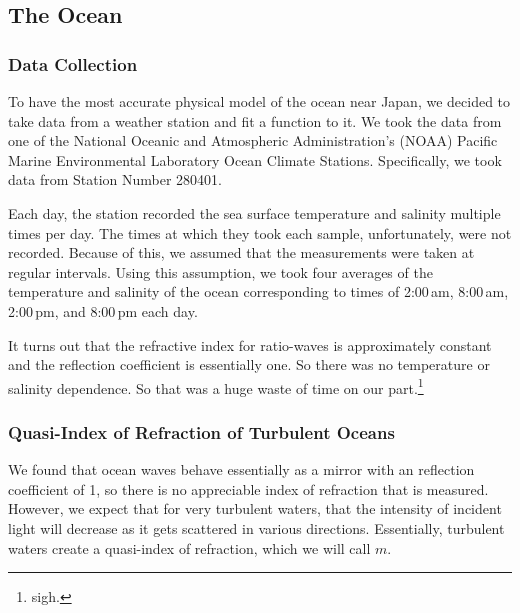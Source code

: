 \documentclass[11pt]{article}
\numberwithin{equation}{section}
\begin{document}

\subsection{The Ocean} %
\label{sub:the_ocean}

\subsubsection{Data Collection} %
\label{ssub:data_collection}

To have the most accurate physical model of the ocean near Japan, we decided to take data from a weather station and fit a function to it. We took the data from one of the National Oceanic and Atmospheric Administration's (NOAA) Pacific Marine Environmental Laboratory Ocean Climate Stations. Specifically, we took data from Station Number 280401. 

Each day, the station recorded the sea surface temperature and salinity multiple times per day. The times at which they took each sample, unfortunately, were not recorded. Because of this, we assumed that the measurements were taken at regular intervals. Using this assumption, we took four averages of the temperature and salinity of the ocean corresponding to times of 2:00\,am, 8:00\,am, 2:00\,pm, and 8:00\,pm each day. 
 
It turns out that the refractive index for ratio-waves is approximately constant and the reflection coefficient is essentially one.\cite{seawater_index} So there was no temperature or salinity dependence. So that was a huge waste of time on our part.\footnote{sigh.}


\subsubsection{Quasi-Index of Refraction of Turbulent Oceans} %
\label{ssub:ocean_ind_of_ref}
We found that ocean waves behave essentially as a mirror with an reflection coefficient of 1, so there is no appreciable index of refraction that is measured.\cite{seawater_index} However, we expect that for very turbulent waters, that the intensity of incident light will decrease as it gets scattered in various directions. Essentially, turbulent waters create a quasi-index of refraction, which we will call $m.$
\end{document}

